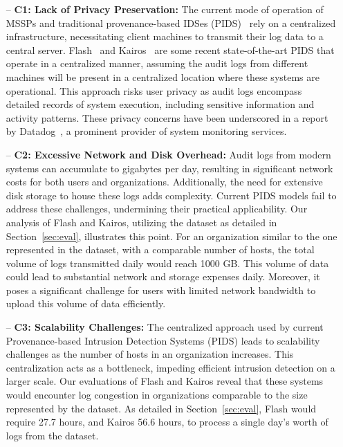 \begin{itemize} [leftmargin=*]
    \item[--] \textbf{C1: Lack of Privacy Preservation:} The current mode of operation of MSSPs and traditional provenance-based IDSes (PIDS)~\cite{flash2024,cheng2023kairos,wang2022threatrace} rely on a centralized infrastructure, necessitating client machines to transmit their log data to a central server. Flash~\cite{flash2024} and Kairos~\cite{cheng2023kairos} are some recent state-of-the-art PIDS that operate in a centralized manner, assuming the audit logs from different machines will be present in a centralized location where these systems are operational. This approach risks user privacy as audit logs encompass detailed records of system execution, including sensitive information and activity patterns. These privacy concerns have been underscored in a report by Datadog~\cite{datadog}, a prominent provider of system monitoring services.
    
    \item[--] \textbf{C2: Excessive Network and Disk Overhead:} Audit logs from modern systems can accumulate to gigabytes per day, resulting in significant network costs for both users and organizations. Additionally, the need for extensive disk storage to house these logs adds complexity. Current PIDS models fail to address these challenges, undermining their practical applicability. Our analysis of Flash and Kairos, utilizing the \optc dataset as detailed in Section~\ref{sec:eval}, illustrates this point. For an organization similar to the one represented in the \optc dataset, with a comparable number of hosts, the total volume of logs transmitted daily would reach 1000 GB. This volume of data could lead to substantial network and storage expenses daily. Moreover, it poses a significant challenge for users with limited network bandwidth to upload this volume of data efficiently.
    
    \item[--] \textbf{C3: Scalability Challenges:} The centralized approach used by current Provenance-based Intrusion Detection Systems (PIDS) leads to scalability challenges as the number of hosts in an organization increases. This centralization acts as a bottleneck, impeding efficient intrusion detection on a larger scale. Our evaluations of Flash and Kairos reveal that these systems would encounter log congestion in organizations comparable to the size represented by the \optc dataset. As detailed in Section~\ref{sec:eval}, Flash would require 27.7 hours, and Kairos 56.6 hours, to process a single day's worth of logs from the \optc dataset. %
\end{itemize}

